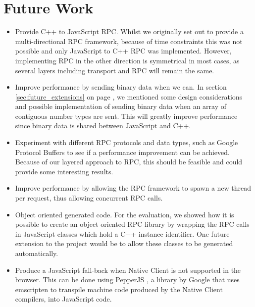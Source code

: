 \section{Future Work} %
\label{sec:future_work}
\begin{itemize}
	\item Provide C++ to JavaScript RPC. Whilst we originally set out to provide a multi-directional RPC framework, because of time constraints this was not possible and only JavaScript to C++ RPC was implemented. However, implementing RPC in the other direction is symmetrical in most cases, as several layers including transport and RPC will remain the same.
	\item Improve performance by sending binary data when we can. In section \ref{sec:future_extensions} on page \pageref{sec:future_extensions}, we mentioned some design considerations and possible implementation of sending binary data when an array of contiguous number types are sent. This will greatly improve performance since binary data is shared between JavaScript and C++.
	\item Experiment with different RPC protocols and data types, such as Google Protocol Buffers to see if a performance improvement can be achieved. Because of our layered approach to RPC, this should be feasible and could provide some interesting results.
	\item Improve performance by allowing the RPC framework to spawn a new thread per request, thus allowing concurrent RPC calls.
	\item Object oriented generated code. For the evaluation, we showed how it is possible to create an object oriented RPC library by wrapping the RPC calls in JavaScript classes which hold a C++ instance identifier. One future extension to the project would be to allow these classes to be generated automatically.
	\item Produce a JavaScript fall-back when Native Client is not supported in the browser. This can be done using PepperJS \cite{pepperjs}, a library by Google that uses emscripten \cite{emscripten} to transpile machine code produced by the Native Client compilers, into JavaScript code.
\end{itemize}
